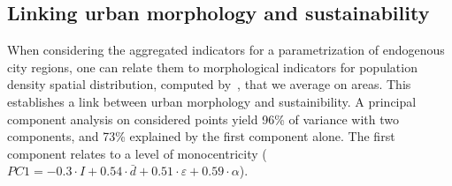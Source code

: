 \documentclass{jimis-en}
\begin{document}








\subsection{Linking urban morphology and sustainability}



When considering the aggregated indicators for a parametrization of endogenous city regions, one can relate them to morphological indicators for population density spatial distribution, computed by~\cite{raimbault2018calibration}, that we average on areas. This establishes a link between urban morphology and sustainibility. A principal component analysis on considered points yield 96\% of variance with two components, and 73\% explained by the first component alone. The first component relates to a level of monocentricity ($PC1 = -0.3\cdot I + 0.54 \cdot \bar{d} + 0.51\cdot \varepsilon + 0.59 \cdot \alpha$).
\end{document}
